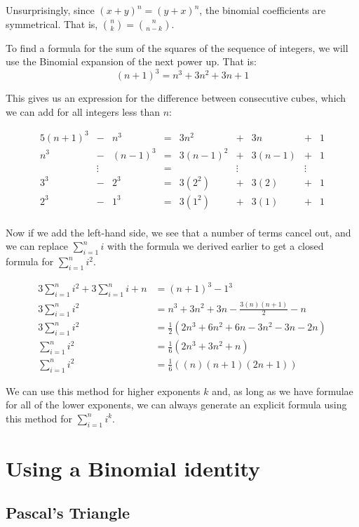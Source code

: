 \documentclass{article}
\begin{document}
Unsurprisingly, since $(x+y)^n = (y+x)^n$, the binomial coefficients are symmetrical.
That is, $\binom{n}{k} = \binom{n}{n-k}$.

To find a formula for the sum of the squares of the sequence of integers, we will use the
Binomial expansion of the next power up. That is:
\[(n+1)^3 = n^3 + 3n^2 + 3n + 1 \]

This gives us an expression for the difference between consecutive cubes, which we can add for
all integers less than $n$:

\begin{alignat*}{5}
	(n+1)^3 &-& n^3     &=& 3n^2     &+& 3n     &+& 1 \\
	n^3     &-& (n-1)^3 &=& 3(n-1)^2 &+& 3(n-1) &+& 1 \\
	      &\vdots&      &=&       &\vdots&  &\vdots& \\
	3^3     &-& 2^3     &=& 3(2^2)   &+& 3(2) &+& 1 \\
	2^3     &-& 1^3     &=& 3(1^2)   &+& 3(1) &+& 1 \\
\end{alignat*}

Now if we add the left-hand side, we see that a number of terms cancel out, and we can replace
$\sum_{i=1}^{n} i$ with the formula we derived earlier to get a closed formula for
$\sum_{i=1}^{n} i^2$.

\begin{align*}
	3\sum_{i=1}^{n} i^2 + 3\sum_{i=1}^{n} i + n &= (n+1)^3 - 1^3 \\
	3\sum_{i=1}^{n} i^2 &= n^3 +3n^2+3n - \frac{3(n)(n+1)}{2} - n \\
	3\sum_{i=1}^{n} i^2 &= \frac{1}{2}\left(2n^3 +6n^2+6n - 3n^2 -3n - 2n\right) \\
	\sum_{i=1}^{n} i^2  &= \frac{1}{6}\left(2n^3 +3n^2+n\right) \\
	\sum_{i=1}^{n} i^2  &= \frac{1}{6}\left((n)(n+1)(2n+1)\right) 
\end{align*} 

We can use this method for higher exponents $k$ and, as long as we have formulae for all 
of the lower exponents, we can always generate an explicit formula using this method for
$\sum_{i=1}^{n} i^k$.

\section{Using a Binomial identity}

\subsection{Pascal's Triangle}
\end{document}
